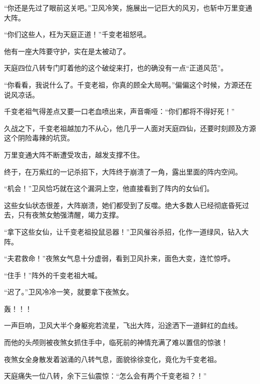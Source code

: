 \begin{this_body}
“你还是先过了眼前这关吧。”卫风冷笑，施展出一记巨大的风刃，也斩中万里变通大阵。

“你们这些人，枉为天庭正道！”千变老祖怒吼。

他有一座大阵要守护，实在是太被动了。

天庭四位八转专门盯着他的这个破绽来打，也的确没有一点“正道风范”。

“你看看，我说什么了。千变老祖，你真的顾全大局啊。”偏偏这个时候，方源还在说风凉话。

千变老祖气得差点又要一口老血喷出来，声音嘶哑：“你们都将不得好死！”

久战之下，千变老祖越加力不从心，他几乎一人面对天庭四仙，还要时刻顾及方源这个阴险毒辣的坑货。

万里变通大阵不断遭受攻击，越发支撑不住。

终于，在万紫红的一记杀招下，大阵终于崩溃了一角，露出里面的阵内空间。

“机会！”卫风恰巧就在这个漏洞上空，他直接看到了阵内的女仙们。

这些女仙状态很差，大阵崩溃，她们都受到了反噬。绝大多数人已经彻底昏死过去，只有夜煞女勉强清醒，竭力支撑。

“拿下这些女仙，让千变老祖投鼠忌器！”卫风催谷杀招，化作一道绿风，钻入大阵。

“夫君救命！”夜煞女气息十分虚弱，看到卫风扑来，面色大变，连忙惊呼。

“住手！”阵外的千变老祖大喊。

“迟了。”卫风冷冷一笑，就要拿下夜煞女。

轰！！！

一声巨响，卫风大半个身躯宛若流星，飞出大阵，沿途洒下一道鲜红的血线。

而他的头颅则被夜煞女抓住手中，临死前的神情充满了难以置信的惊骇！

夜煞女全身散发着汹涌的八转气息，面貌徐徐变化，竟化为千变老祖。

天庭痛失一位八转，余下三仙震惊：“怎么会有两个千变老祖？！”

\end{this_body}

